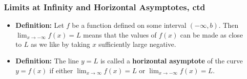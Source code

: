 \documentclass[serif,ignorenonframetext]{beamer}
\newcommand{\ds}{\displaystyle}
\begin{document}
\begin{frame}
  \frametitle{Limits at Infinity and Horizontal Asymptotes, ctd}
  \quad
  \quad
  \begin{itemize}[<+->]
  \item \textbf{Definition:} Let $f$ be a function defined on
    some interval $(-\infty,b)$.  Then $\ds \lim_{x\to -\infty} f(x)=L$
    means that the values of $f(x)$ can be made as close to $L$ as
    we like by taking $x$ sufficiently large negative.
  \item \textbf{Definition:} The line $y=L$ is called a \textbf{horizontal
    asymptote} of the curve $y=f(x)$ if either
    $\ds \lim_{x\to\infty} f(x)=L$ or $\ds \lim_{x\to -\infty} f(x)=L$.
  \end{itemize}
\end{frame}
\end{document}
